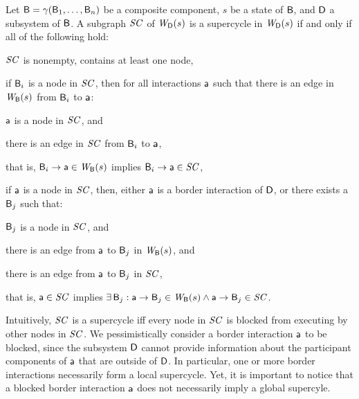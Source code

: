 \begin{definition}
\label{defn:supercycleLoc} 
Let $\B = \gamma(\B_1,\dots,\B_n)$ be a composite component, $s$ be a state of $\B$, and $\DS$ a subsystem
of $\B$.
A subgraph $\SC$ of  $\lwfg{B}{s}{\DS}$ is a supercycle in $\lwfg{B}{s}{\DS}$ if and only if all of the following hold:
\begin{nlst1}
   \item $\SC$ is nonempty, \ie contains at least one node,

   \item if $\B_i$ is a node in $\SC$, then for all interactions $\act$ such that
there is an edge in $\wfg{\B}{s}$ from $\B_i$ to $\act$:
      \begin{nlst2}
      \item $\act$ is a node in $\SC$, and 
      \item there is an edge in $\SC$ from $\B_i$ to $\act$,
      \end{nlst2}
that is, $\B_i \ar \act \in \wfg{\B}{s}$ implies $\B_i \ar \act \in \SC$,

   \item 
if $\act$ is a node in $\SC$, then, either $\act$ is a border interaction of $\DS$, or  there exists a $\B_j$ such that:
      \begin{nlst2}
      \item $\B_j$  is a node in $\SC$, and
      \item there is an edge from $\act$ to $\B_j$ in $\wfg{\B}{s}$, and
      \item there is an edge from $\act$ to $\B_j$ in $\SC$,
      \end{nlst2}
that is, $\act \in \SC$ implies $\ex \B_j : \act \ar \B_j \in \wfg{\B}{s} \land \act \ar \B_j \in \SC$.

\end{nlst1}
\end{definition}
Intuitively, $\SC$ is a supercycle iff every node in $\SC$ is blocked from executing by other nodes in $\SC$. We pessimistically consider a border
interaction $\act$ to be blocked, since the subsystem $\DS$ cannot provide information about the participant components of $\act$ that are outside of
$\DS$. In particular, one or more border interactions necessarily form a local supercycle. Yet, it is important to notice that a blocked border interaction $\act$ does
not necessarily imply a global supercyle.


